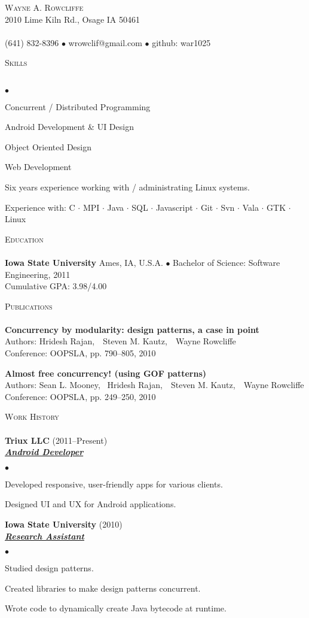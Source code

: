 \documentclass{article}
\newcommand{\lineunder} {
	\vspace*{-8pt} \\ \hspace*{-18pt} \hrulefill \\
}
\newcommand{\header}[1] {
	{\hspace*{-15pt}\vspace*{6pt} \textsc{#1}} \vspace*{-6pt} \lineunder
}
\newcommand{\employer}[3] {
	{ \textbf{#1} (#2)\\ \underline{\textbf{\emph{#3}}}\\  }
}
\newcommand{\paper}[5] {
	{\textbf{#1}\\ \hspace*{15pt}Authors: #2\\ \hspace*{15pt}#3, #4, #5\\ \vspace*{8pt}}
}
\newcommand{\contact}[4] {
	\vspace*{-8pt}\begin{center}{\LARGE \scshape {#1}}\\#2 \lineunder#3 $\bullet$ #4\end{center}\vspace*{-8pt}
}
\newenvironment{achievements} {
	\begin{list}{$\bullet$}
		{\topsep 0pt \itemsep -2pt}
	}{
		\vspace*{4pt}\end{list}
	}
\newcommand{\school}[4] {
	\textbf{#1} #2 $\bullet$ #3\\
	\hspace*{15pt}#4 \\
	\vspace*{5pt}
}
\newcommand{\subject}[1] {\mbox{#1} $\cdot$}
\newcommand{\lastsubject}[1] {\mbox{#1}}
\begin{document}
\small
\smallskip
\vspace*{-44pt}

\contact{Wayne A. Rowcliffe}
{2010 Lime Kiln Rd., Osage IA 50461}
{(641) 832-8396 $\bullet$ wrowclif@gmail.com}%
{github: war1025}

\header{Skills}

	\begin{achievements}
		\item{Concurrent / Distributed Programming}
		\item{Android Development \& UI Design}
		\item{Object Oriented Design}
		\item{Web Development}
		\item{Six years experience working with / administrating Linux systems.}
		\item{Experience with:
			\subject{C}
			\subject{MPI}
			\subject{Java}
			\subject{SQL}
			\subject{Javascript}
			\subject{Git}
			\subject{Svn}
			\subject{Vala}
			\subject{GTK}
			\lastsubject{Linux}
		}

	\end{achievements}

\header{Education}

	\school{Iowa State University}{Ames, IA, U.S.A.}{Bachelor of Science: Software Engineering, 2011}
	{Cumulative GPA: 3.98/4.00}

\header{Publications}

	\paper{Concurrency by modularity: design patterns, a case in point}{Hridesh Rajan,~ Steven M. Kautz,~ Wayne Rowcliffe}
		{Conference: OOPSLA}{pp. 790--805}{2010}
	\paper{Almost free concurrency! (using GOF patterns)}{Sean L. Mooney,~ Hridesh Rajan,~ Steven M. Kautz,~ Wayne Rowcliffe}
		{Conference: OOPSLA}{pp. 249--250}{2010}


\header{Work History}

	\employer{Triux LLC}{2011--Present}{Android Developer}
		\begin{achievements}
			\item{Developed responsive, user-friendly apps for various clients.}
			\item{Designed UI and UX for Android applications.}
		\end{achievements}

	\employer{Iowa State University}{2010}{Research Assistant}
		\begin{achievements}
			\item{Studied design patterns.}
			\item{Created libraries to make design patterns concurrent.}
			\item{Wrote code to dynamically create Java bytecode at runtime.}
		\end{achievements}
\end{document}
